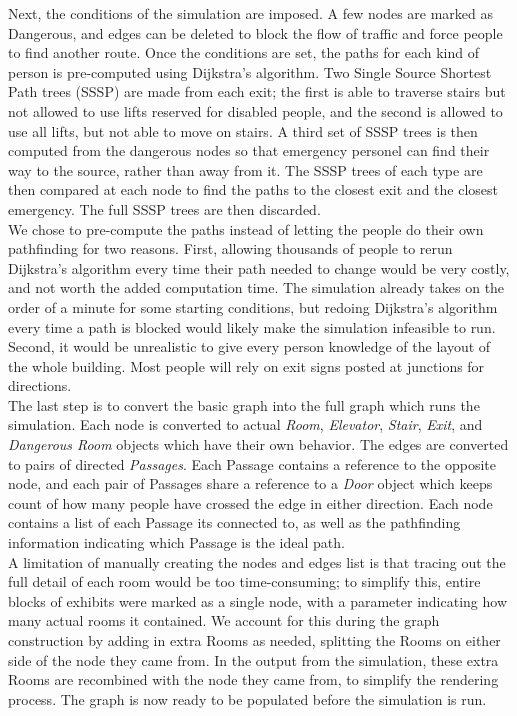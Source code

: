 \documentclass[12pt]{article}
\begin{document}
Next, the conditions of the simulation are imposed. A few nodes are marked as Dangerous, and edges can be deleted to block the flow of traffic and force people to find another route. Once the conditions are set, the paths for each kind of person is pre-computed using Dijkstra's algorithm. Two Single Source Shortest Path trees (SSSP) are made from each exit; the first is able to traverse stairs but not allowed to use lifts reserved for disabled people, and the second is allowed to use all lifts, but not able to move on stairs. A third set of SSSP trees is then computed from the dangerous nodes so that emergency personel can find their way to the source, rather than away from it. The SSSP trees of each type are then compared at each node to find the paths to the closest exit and the closest emergency. The full SSSP trees are then discarded.\\

We chose to pre-compute the paths instead of letting the people do their own pathfinding for two reasons. First, allowing thousands of people to rerun Dijkstra's algorithm every time their path needed to change would be very costly, and not worth the added computation time. The simulation already takes on the order of a minute for some starting conditions, but redoing Dijkstra's algorithm every time a path is blocked would likely make the simulation infeasible to run. Second, it would be unrealistic to give every person knowledge of the layout of the whole building. Most people will rely on exit signs posted at junctions for directions.\\

The last step is to convert the basic graph into the full graph which runs the simulation. Each node is converted to actual \textit{Room}, \textit{Elevator}, \textit{Stair}, \textit{Exit}, and \textit{Dangerous Room} objects which have their own behavior. The edges are converted to pairs of directed \textit{Passages}. Each Passage contains a reference to the opposite node, and each pair of Passages share a reference to a \textit{Door} object which keeps count of how many people have crossed the edge in either direction. Each node contains a list of each Passage its connected to, as well as the pathfinding information indicating which Passage is the ideal path.\\

A limitation of manually creating the nodes and edges list is that tracing out the full detail of each room would be too time-consuming; to simplify this, entire blocks of exhibits were marked as a single node, with a parameter indicating how many actual rooms it contained. We account for this during the graph construction by adding in extra Rooms as needed, splitting the Rooms on either side of the node they came from. In the output from the simulation, these extra Rooms are recombined with the node they came from, to simplify the rendering process. The graph is now ready to be populated before the simulation is run.
\end{document}
